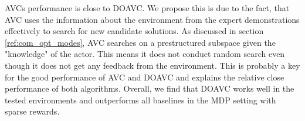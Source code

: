 AVCs performance is close to DOAVC. We propose this is due to the fact, that AVC uses the information about the environment 
from the expert demonstrations effectively to search for new candidate solutions. As discussed in section \ref{ref:com_opt_modes}, AVC searches on a prestructured subspace given the "knowledge" of the 
actor. This means it does not conduct random search even though it does not get any feedback from the environment. This is probably a key for the good performance of AVC and DOAVC and explains 
the relative close performance of both algorithms. Overall, we find that DOAVC works well in the tested environments and outperforms all baselines in the MDP setting with sparse rewards.